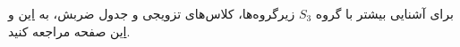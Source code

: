 \documentclass[a4paper, 12pt]{article}
\begin{document}
\vspace{1.5em}
\noindent
برای آشنایی بیشتر با گروه 
$S_3$  
زیرگروه‌ها، کلاس‌های تزویجی و جدول ضربش، به 
\href{https://groupprops.subwiki.org/wiki/Subgroup_structure_of_symmetric_group:S3}{این}
 و 
 \href{https://groupprops.subwiki.org/wiki/Determination_of_multiplication_table_of_symmetric_group:S3}{این}
  صفحه مراجعه کنید.
\end{document}

